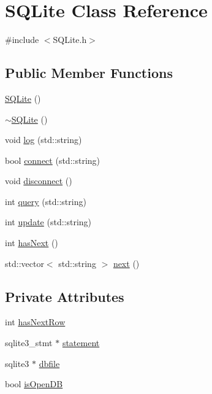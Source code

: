 \hypertarget{classSQLite}{\section{\-S\-Q\-Lite \-Class \-Reference}
\label{classSQLite}
}


{\ttfamily \#include $<$\-S\-Q\-Lite.\-h$>$}

\subsection*{\-Public \-Member \-Functions}
\begin{DoxyCompactItemize}
\item 
\hyperlink{classSQLite_ae7b35dc7e3c41543a0acde669ad4ba0d}{\-S\-Q\-Lite} ()
\item 
\hyperlink{classSQLite_a5b30b82149fe1cc07046f25a9935747f}{$\sim$\-S\-Q\-Lite} ()
\item 
void \hyperlink{classSQLite_a1937c8a95aebbfc9b82bf7b30aa6375d}{log} (std\-::string)
\item 
bool \hyperlink{classSQLite_a421fe9dd5fd1abd92b00857253823c90}{connect} (std\-::string)
\item 
void \hyperlink{classSQLite_af4a886ee189358e84337a5e81ed0d515}{disconnect} ()
\item 
int \hyperlink{classSQLite_a4124efb4d6521bcad1666d949ae36311}{query} (std\-::string)
\item 
int \hyperlink{classSQLite_addf9309356a45a01f74831cb803b4b8d}{update} (std\-::string)
\item 
int \hyperlink{classSQLite_a985917c1b24cfdc802851d22f5d17c3e}{has\-Next} ()
\item 
std\-::vector$<$ std\-::string $>$ \hyperlink{classSQLite_ad85ca830bc58aa3c299489c2eaa90080}{next} ()
\end{DoxyCompactItemize}
\subsection*{\-Private \-Attributes}
\begin{DoxyCompactItemize}
\item 
int \hyperlink{classSQLite_add18111d5de9e218a147dbceb0aa7899}{has\-Next\-Row}
\item 
sqlite3\-\_\-stmt $\ast$ \hyperlink{classSQLite_ac9fcbb5e55073780e5b7a6b10147d74e}{statement}
\item 
sqlite3 $\ast$ \hyperlink{classSQLite_a206e8b4696cbea9d8091310cf17213ee}{dbfile}
\item 
bool \hyperlink{classSQLite_a7d855ec7c6e9644201b59321375a6fa5}{is\-Open\-D\-B}
\end{DoxyCompactItemize}


